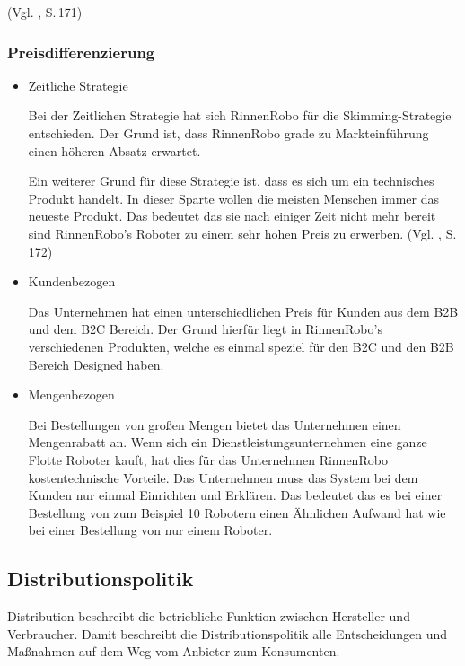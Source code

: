     (Vgl. \cite{Bruhn2014a}, S.\,171)

\subsubsection{Preisdifferenzierung} \label{Preisdiff}
    \begin{itemize}
        \item Zeitliche Strategie
            
            Bei der Zeitlichen Strategie hat sich RinnenRobo für die Skimming-Strategie entschieden. Der Grund ist, dass 
            RinnenRobo grade zu Markteinführung einen höheren Absatz erwartet.

            Ein weiterer Grund für diese Strategie ist, dass es sich um ein technisches Produkt handelt. In dieser
            Sparte wollen die meisten Menschen immer das neueste Produkt. Das bedeutet das sie nach einiger Zeit 
            nicht mehr bereit sind RinnenRobo's Roboter zu einem sehr hohen Preis zu erwerben. 
            (Vgl. \cite{Bruhn2014a}, S.\,172)

        \item Kundenbezogen

            Das Unternehmen hat einen unterschiedlichen Preis für Kunden aus dem B2B und dem B2C Bereich. Der Grund 
            hierfür liegt in RinnenRobo's verschiedenen Produkten, welche es einmal speziel für den B2C und den B2B
            Bereich Designed haben.

        \item Mengenbezogen
            
            Bei Bestellungen von großen Mengen bietet das Unternehmen einen Mengenrabatt an. Wenn sich ein 
            Dienstleistungsunternehmen eine ganze Flotte Roboter kauft, hat dies für das Unternehmen RinnenRobo
            kostentechnische Vorteile. Das Unternehmen muss das System bei dem Kunden nur einmal Einrichten und
            Erklären. Das bedeutet das es bei einer Bestellung von zum Beispiel 10 Robotern einen Ähnlichen Aufwand hat
            wie bei einer Bestellung von nur einem Roboter.
        \end{itemize}

        \subsection{Distributionspolitik} \label{distro}
        Distribution beschreibt die betriebliche Funktion zwischen Hersteller und Verbraucher. Damit beschreibt die
        Distributionspolitik alle Entscheidungen und Maßnahmen auf dem Weg vom Anbieter zum Konsumenten.
    
